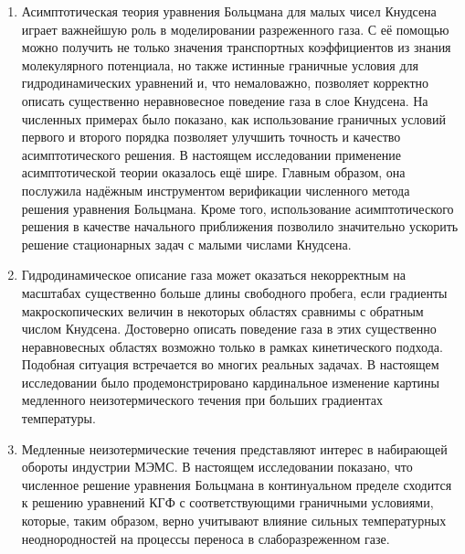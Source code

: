 \begin{enumerate}[wide]
\item Асимптотическая теория уравнения Больцмана для малых чисел Кнудсена
играет важнейшую роль в моделировании разреженного газа.
С её помощью можно получить не только значения транспортных коэффициентов из знания молекулярного потенциала,
но также истинные граничные условия для гидродинамических уравнений и, что немаловажно,
позволяет корректно описать существенно неравновесное поведение газа в слое Кнудсена.
На численных примерах было показано, как использование граничных условий первого и второго порядка
позволяет улучшить точность и качество асимптотического решения.
В настоящем исследовании применение асимптотической теории оказалось ещё шире.
Главным образом, она послужила надёжным инструментом верификации численного метода решения уравнения Больцмана.
Кроме того, использование асимптотического решения в качестве начального приближения позволило
значительно ускорить решение стационарных задач с малыми числами Кнудсена.

\item Гидродинамическое описание газа может оказаться некорректным на масштабах существенно больше длины свободного пробега,
если градиенты макроскопических величин в некоторых областях сравнимы с обратным числом Кнудсена.
Достоверно описать поведение газа в этих существенно неравновесных областях
возможно только в рамках кинетического подхода.
Подобная ситуация встречается во многих реальных задачах.
В настоящем исследовании было продемонстрировано кардинальное изменение картины
медленного неизотермического течения при больших градиентах температуры.

\item Медленные неизотермические течения представляют интерес в набирающей обороты индустрии МЭМС.
В настоящем исследовании показано, что численное решение уравнения Больцмана в континуальном пределе
сходится к решению уравнений КГФ с соответствующими граничными условиями,
которые, таким образом, верно учитывают влияние сильных температурных
неоднородностей на процессы переноса в слаборазреженном газе.

\end{enumerate}
